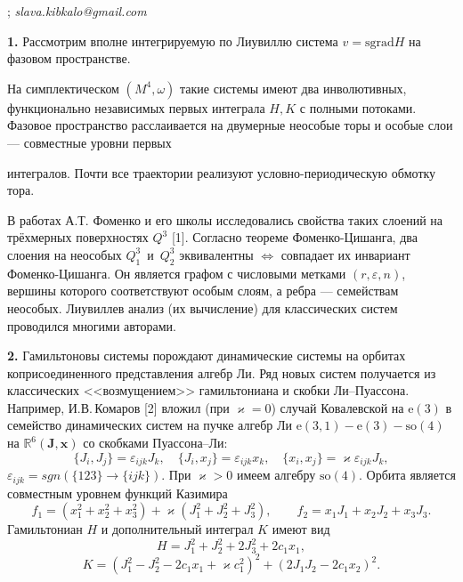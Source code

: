 

; {\it slava.kibkalo@gmail.com}

\vzmscaption


\textbf{1.} Рассмотрим вполне интегрируемую по Лиувиллю система $v = \textrm{sgrad} H$ на фазовом пространстве.

На симплектическом $(M^4, \omega)$ такие системы имеют два инволютивных, функционально независимых первых интеграла $H, K$ с полными потоками. Фазовое пространство расслаивается на двумерные неособые торы и особые слои --- совместные уровни первых{ интегралов. Почти все траектории реализуют условно-периодическую обмотку тора.

В работах А.Т. Фоменко и его школы исследовались свойства таких слоений на трёхмерных поверхностях $Q^3$ [1]. Согласно теореме Фоменко-Цишанга, два слоения на неособых $Q^3_1$~и~$Q^3_2$ эквивалентны $\Leftrightarrow$ совпадает их инвариант Фоменко-Цишанга. Он является графом с числовыми метками $(r, \varepsilon, n)$, вершины которого соответствуют особым слоям, а ребра --- семействам неособых. Лиувиллев анализ (их вычисление) для классических систем проводился многими авторами.

\textbf{2.}  Гамильтоновы системы порождают динамические системы на орбитах коприсоединенного представления алгебр Ли. Ряд новых систем получается из классических <<возмущением>> гамильтониана и скобки Ли--Пуассона. Например, И.В.\,Комаров [2] вложил (при $\varkappa =0$) случай Ковалевской на $\textrm{e}(3)$  в семейство динамических систем на пучке алгебр Ли $\textrm{e}(3,1)-\textrm{e}(3)-\textrm{so}(4)$ на $\mathbb{R}^6(\mathbf{J}, \mathbf{x})$ со скобками Пуассона--Ли: %
\[\{J_i, J_j\} =
\varepsilon_{ijk}J_k, \quad \{J_i, x_j\} = \varepsilon_{ijk}x_k,
\quad \{x_i, x_j\} = \varkappa \varepsilon_{ijk}J_k, \]%
$\varepsilon_{ijk} = sgn(\{123\} \rightarrow \{ijk\})$. При  $\varkappa>0$ имеем алгебру $\textrm{so}(4)$. Орбита является совместным уровнем функций Казимира
%
\[f_1 = (x_1^2 + x_2^2 + x_3^2) + \varkappa (J_1^2 +J_2^2 +J_3^2),
\qquad  f_2 = x_1 J_1 + x_2 J_2 +x_3 J_3.\]
%
Гамильтониан $H$ и дополнительный интеграл $K$ имеют вид
%
\[H = J_1^2 + J_2^2 + 2J_3^2 + 2 c_1 x_1, \]
\[K = (J_1^2 - J_2^2-2c_1 x_1 + \varkappa
c_1^2)^2 + (2J_1 J_2 - 2 c_1 x_2)^2.\]

}

